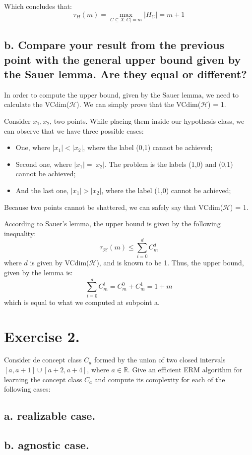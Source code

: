 \documentclass[11pt, a4paper]{article}
\begin{document}
\begin{large}
Which concludes that:
$$
\tau_H(m)=\max _{C \subseteq X: C \mid=m}\left|H_C\right| = m+1
$$


\subsection{b. Compare your result from the previous point with the general upper bound given by the Sauer lemma. Are they equal or different?}
In order to compute the upper bound, given by the Sauer lemma, we need to calculate the VCdim($\mathcal{H}$). We can simply prove that the VCdim($\mathcal{H}$) = 1.

Consider $x_1,x_2$, two points. While placing them inside our hypothesis class, we can observe that we have three possible cases:
\begin{itemize}
    \item One, where $|x_1| < |x_2|$, where the label (0,1) cannot be achieved;
    \item Second one, where $|x_1| = |x_2|$. The problem is the labels (1,0) and (0,1) cannot be achieved;
    \item And the last one, $|x_1| > |x_2|$, where the label (1,0) cannot be achieved;
\end{itemize}
Because two points cannot be shattered, we can safely say that VCdim($\mathcal{H}$) = 1.

According to Sauer's lemma, the upper bound is given by the following inequality:
$$
\tau_{\mathcal{H}}(m) \leq \sum_{i=0}^d C_m^d
$$
where $d$ is given by VCdim($\mathcal{H}$), and is known to be 1. Thus, the upper bound, given by the lemma is:
$$
\sum_{i=0}^d C_m^i=C_m^0+C_m^1=1+m
$$
which is equal to what we computed at subpoint a.
\newpage

\section{Exercise 2.}
Consider de concept class $C_a$ formed by the union of two closed intervals $[a, a+1] \cup[a+2, a+4]$, where $a \in \mathbb{R}$. Give an efficient ERM algorithm for learning the concept class $C_a$ and compute its complexity for each of the following cases:
\subsection{a. realizable case.}
\subsection{b. agnostic case.}



\end{large}
\end{document}
